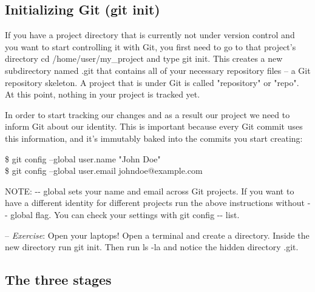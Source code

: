 \documentclass[12pt,a4]{article}
\newcommand{\ilcode}[1]{\textcolor[RGB]{160, 110, 220}{#1}}
\begin{document}
\subsection{Initializing Git (git init)}
If you have a project directory that is currently not under version control and
you want to start controlling it with Git, you first need to go to that
project’s directory \ilcode{cd /home/user/my\_project} and type \ilcode{git
init}. This creates a new subdirectory named .git that contains all of your
necessary repository files -- a Git repository skeleton. A project that is under
Git is called "repository" or "repo". At this point, nothing in your project is
tracked yet.

In order to start tracking our changes and as a result our project we need to
inform Git about our identity. This is important because every Git commit uses
this information, and it’s immutably baked into the commits you start creating:

\hspace*{1cm}
\ilcode{\$ git config --global user.name "John Doe"}\\
\hspace*{1cm}
\ilcode{\$ git config --global user.email johndoe@example.com}

{\sf NOTE:} \ilcode{-{}- global} sets your name and email across Git projects.
If you want to have a different identity for different projects run the above
instructions without \ilcode{-{}- global} flag. You can check your settings with
\ilcode{git config -{}- list}.

\begin{center}
\end{center}

{\sf -- \emph{Exercise}:} Open your laptops! Open a terminal and create a
directory. Inside the new directory run \ilcode{git init}. Then run \ilcode{ls
-la} and notice the hidden directory \ilcode{.git}.

\subsection{The three stages}
\begin{center}
\end{center}
\end{document}
